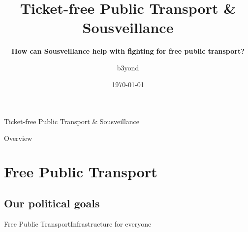 \documentclass[10pt]{beamer}
\title[] %
{ %
      \textbf{Ticket-free Public Transport \& Sousveillance}
}
\subtitle[Ticket-free Public Transport \& Sousveillance]
{
      \textbf{How can Sousveillance help with fighting for free public transport?}
}
\author[b3yond]
{      b3yond \\
      {}
}
\institute[]
{
      links\_tech
  
}
\date{\today}
\begin{document}

{\1%



\begin{frame}{Ticket-free Public Transport \& Sousveillance}

\maketitle
\tableofcontents

\end{frame}

\begin{frame}{Overview}{}

\tableofcontents

\end{frame}

\section{Free Public Transport}
\subsection{Our political goals}
\begin{frame}{Free Public Transport}{Infrastructure for everyone}


\end{frame}}
\end{document}

